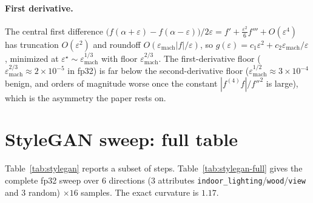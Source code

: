 \documentclass[10pt]{article} %
\newcommand{\eps}{\varepsilon}
\begin{document}
\paragraph{First derivative.} The central first difference
$\big(f(\alpha+\eps)-f(\alpha-\eps)\big)/2\eps=f'+\tfrac{\eps^2}{6}f'''+O(\eps^4)$
has truncation $O(\eps^2)$ and roundoff $O(\eps_{\mathrm{mach}}|f|/\eps)$, so
$g(\eps)=c_1\eps^2+c_2\eps_{\mathrm{mach}}/\eps$, minimized at
$\eps^\star\sim\eps_{\mathrm{mach}}^{1/3}$ with floor
$\eps_{\mathrm{mach}}^{2/3}$. The first-derivative floor
($\eps_{\mathrm{mach}}^{2/3}\approx2\times10^{-5}$ in fp32) is far below the
second-derivative floor ($\eps_{\mathrm{mach}}^{1/2}\approx3\times10^{-4}$ benign,
and orders of magnitude worse once the constant $|f^{(4)}f|/f''^2$ is large), which
is the asymmetry the paper rests on.

\section{StyleGAN sweep: full table}
\label{app:stylegan}
Table~\ref{tab:stylegan} reports a subset of steps. Table~\ref{tab:stylegan-full}
gives the complete fp32 sweep over $6$ directions ($3$ attributes
\texttt{indoor\_lighting}/\texttt{wood}/\texttt{view} and $3$ random) $\times16$
samples. The exact curvature is $1.17$.
\end{document}
